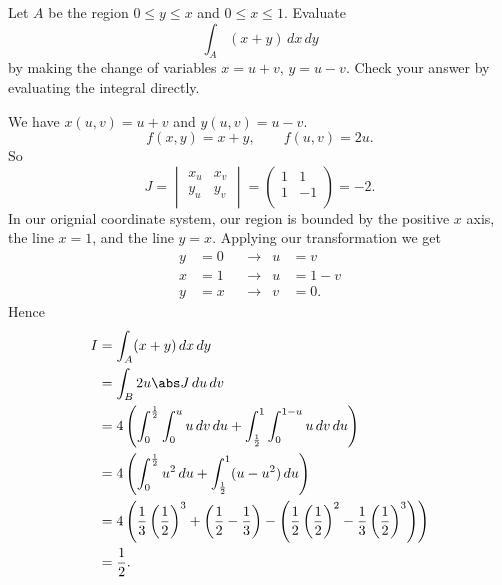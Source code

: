 
\setcounter{question}{105}
\question Let $A$ be the region $0 \leq y \leq x$ and $0 \leq x \leq 1$.
Evaluate
\[
    \int_A (x+y) \,dx\,dy
\]
by making the change of variables $x = u + v$, $y = u - v$.
Check your answer by evaluating the integral directly.
\begin{solution}
    We have $x(u,v) = u + v$ and $y(u,v) = u - v$.
    \[
        f(x,y) = x + y, \qquad f(u,v) = 2u.
    \]
    So 
    \[
        J =
        \begin{vmatrix}
            x_u & x_v \\
            y_u & y_v \\
        \end{vmatrix}
        =
        \begin{pmatrix}
            1 & 1 \\
            1 & -1 \\
        \end{pmatrix}
        = -2.
    \]
    In our orignial coordinate system, our region is bounded by 
    the positive $x$ axis,
    the line $x = 1$, 
    and the line $y = x$.
    Applying our transformation we get
    \begin{align*}
        y &= 0 && \to & u &= v     \\
        x &= 1 && \to & u &= 1 - v \\
        y &= x && \to & v &= 0.        
    \end{align*}
    Hence
    \begin{align*}
        I
        &= \int_A (x + y) \,dx\,dy \\
        &= \int_B 2u \abs J \,du\,dv \\
        &= 4
            \left( 
                \int_0^{\frac12} 
                \int_0^{u} u \,dv\,du
                + \int_{\frac12}^1
                \int_0^{1-u} u \,dv\,du
            \right) \\
        &= 4
            \left(
                \int_0^{\frac12} 
                u^2 \,du
                + \int_{\frac12}^1
                (u - u^2) \,du
            \right) \\
        &= 4
            \left(
                \frac13 \left(\frac12\right)^3 +
                \left(
                    \frac12 - \frac13
                \right) -
                \left(
                    \frac12 \left(\frac12\right)^2
                    - \frac13 \left(\frac12\right)^3
                \right)
            \right) \\
        &= \frac12.
    \end{align*}
\end{solution}


